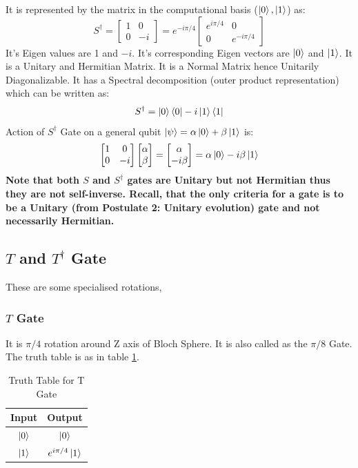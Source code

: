 It is represented by the matrix in the computational basis ($\ket{0},\ket{1}$) as:
\[
    S^{\dagger}=\begin{bmatrix}
        1 & 0 \\
        0 & -i
    \end{bmatrix}=e^{-i\pi/4}\begin{bmatrix}
        e^{i\pi/4} & 0 \\
        0 & e^{-i\pi/4}
    \end{bmatrix}
\]
It's Eigen values are 1 and $-i$. It's corresponding Eigen vectors are $\ket{0}$ and $\ket{1}$.
It is a Unitary and Hermitian Matrix. It is a Normal Matrix hence Unitarily Diagonalizable.
It has a Spectral decomposition (outer product representation) which can be written as:
\[
    S^{\dagger}=\ket{0}\bra{0}-i\ket{1}\bra{1}
\]
Action of $S^{\dagger}$ Gate on a general qubit $\ket{\psi}=\alpha\ket{0}+\beta\ket{1}$ is:
\[
    \begin{bmatrix}
        1 & 0 \\
        0 & -i
    \end{bmatrix}\begin{bmatrix}
        \alpha \\
        \beta
    \end{bmatrix}=\begin{bmatrix}
        \alpha \\
        -i\beta
    \end{bmatrix}=\alpha\ket{0}-i\beta\ket{1}
\]
\textbf{Note that both $S$ and $S^{\dagger}$ gates are Unitary but not Hermitian thus they are not self-inverse. Recall, that 
the only criteria for a gate is to be a Unitary (from Postulate 2: Unitary evolution) gate and not necessarily Hermitian.}

\subsection{\texorpdfstring{$T$ and $T^{\dagger}$ Gate}{T and T-dagger Gate}}
These are some specialised rotations,
\subsubsection{$T$ Gate}
It is $\pi/4$ rotation around Z axis of Bloch Sphere.
It is also called as the $\pi/8$ Gate. The truth table is as in table \ref{tab:t}.
\begin{table}[ht]
    \centering
    \begin{tabular}{|c|c|}
        \hline
        Input & Output\\
        \hline
        $\ket{0}$ & $\ket{0}$\\
        $\ket{1}$ & $e^{i\pi/4}\ket{1}$\\
        \hline
    \end{tabular}
    \caption{Truth Table for T Gate}
    \label{tab:t}
\end{table}

